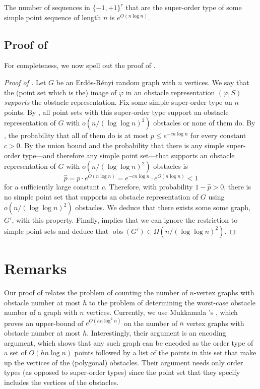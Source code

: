 \documentclass{patmorin}
\DeclareMathOperator{\obs}{obs}
\begin{document}
\begin{lem}
  The number of sequences in $\{-1,{+1}\}^{r}$ that are the super-order
  type of some simple point sequence of length $n$ is $e^{O(n\log n)}$.
\end{lem}

\subsection{Proof of }

For completeness, we now spell out the proof of .

\begin{proof}[Proof of ]
  Let $G$ be an Erd\"os-R\'enyi random graph with $n$ vertices.
  We say that the (point set which is the) image of $\varphi$ in an
  obstacle representation $(\varphi, S)$ \emph{supports} the obstacle
  representation.  Fix some simple super-order type on $n$ points.
  By , all point sets with this super-order type
  support an obstacle representation of $G$ with $o(n/(\log\log n)^2)$
  obstacles or none of them do.  By , the probability that
  all of them do is at most $p\le e^{-cn\log n}$ for every constant $c>0$.
  By the union bound and  the probability
  that there is any simple super-order type---and therefore any simple
  point set---that supports an obstacle representation of $G$ with
  $o(n/(\log\log n)^2)$ obstacles is
  \[
     \hat p = p\cdot e^{O(n\log n)} = e^{-cn\log n}\cdot e^{O(n\log n)} < 1
  \]
  for a sufficiently large constant $c$.  Therefore, with probability
  $1-\hat p > 0$, there is no simple point set that supports an obstacle
  representation of $G$ using $o(n/(\log\log n)^2)$ obstacles. We deduce
  that there exists some some graph, $G'$, with this property.  Finally,
   implies that we can ignore the restriction to simple
  point sets and deduce that $\obs(G')\in \Omega(n/(\log\log n)^2)$.
\end{proof}


\section{Remarks}

Our proof of  relates the problem of counting the number
of $n$-vertex graphs with obstacle number at most $h$ to the problem of
determining the worst-case obstacle number of a graph with $n$ vertices.
Currently, we use Mukkamala \etal's , which proves an
upper-bound of $e^{O(hn\log^2 n)}$ on the number of $n$ vertex graphs
with obstacle number at most $h$.  Interestingly, their argument is an
encoding argument, which shows that any such graph can be encoded as the
order type of a set of $O(hn\log n)$ points followed by a list of the
points in this set that make up the vertices of the (polygonal) obstacles.
Their argument needs only order types (as opposed to super-order types)
since the point set that they specify includes the vertices of the
obstacles.
\end{document}
